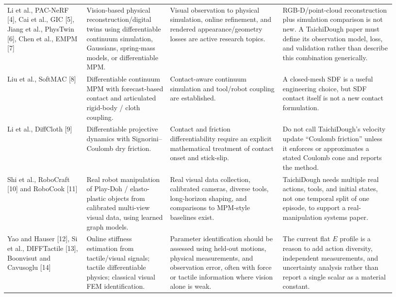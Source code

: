\documentclass[11pt]{article}
\begin{document}
\begin{longtable}{p{0.19\linewidth}p{0.20\linewidth}p{0.27\linewidth}p{0.27\linewidth}}
\addlinespace
Li et al., PAC-NeRF [4], Cai et al., GIC [5], Jiang et al., PhysTwin [6], Chen et al., EMPM [7] & Vision-based physical reconstruction/digital twins using differentiable continuum simulation, Gaussians, spring-mass models, or differentiable MPM. & Visual observation to physical simulation, online refinement, and rendered appearance/geometry losses are active research topics. & RGB-D/point-cloud reconstruction plus simulation comparison is not new. A TaichiDough paper must define its observation model, loss, and validation rather than describe this combination generically.\\
\addlinespace
Liu et al., SoftMAC [8] & Differentiable continuum MPM with forecast-based contact and articulated rigid-body / cloth coupling. & Contact-aware continuum simulation and tool/robot coupling are established. & A closed-mesh SDF is a useful engineering choice, but SDF contact itself is not a new contact formulation.\\
\addlinespace
Li et al., DiffCloth [9] & Differentiable projective dynamics with Signorini--Coulomb dry friction. & Contact and friction differentiability require an explicit mathematical treatment of contact onset and stick-slip. & Do not call TaichiDough's velocity update ``Coulomb friction'' unless it enforces or approximates a stated Coulomb cone and reports the method.\\
\addlinespace
Shi et al., RoboCraft [10] and RoboCook [11] & Real robot manipulation of Play-Doh / elasto-plastic objects from calibrated multi-view visual data, using learned graph models. & Real visual data collection, calibrated cameras, diverse tools, long-horizon shaping, and comparisons to MPM-style baselines exist. & TaichiDough needs multiple real actions, tools, and initial states, not one temporal split of one episode, to support a real-manipulation systems paper.\\
\addlinespace
Yao and Hauser [12], Si et al., DIFFTactile [13], Boonvisut and Cavusoglu [14] & Online stiffness estimation from tactile/visual signals; tactile differentiable physics; classical visual FEM identification. & Parameter identification should be assessed using held-out motions, physical measurements, and observation error, often with force or tactile information where vision alone is weak. & The current flat $E$ profile is a reason to add action diversity, independent measurements, and uncertainty analysis rather than report a single scalar as a material constant.\\
\bottomrule
\end{longtable}
\end{document}
